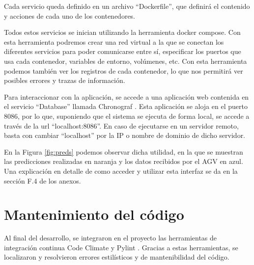 Cada servicio queda definido en un archivo ``Dockerfile'', que definirá el contenido y acciones de cada uno de los 
contenedores.

Todos estos servicios se inician utilizando la herramienta docker compose. Con esta herramienta podremos crear
una red virtual a la que se conectan los diferentes servicios para poder comunicarse entre sí, especificar los
puertos que usa cada contenedor, variables de entorno, volúmenes, etc. Con esta herramienta podemos también ver los registros de cada contenedor, lo que nos permitirá ver posibles errores 
y trazas de información.

Para interaccionar con la aplicación, se accede a una aplicación web contenida en el servicio ``Database'' llamada 
Chronograf \cite{chronograf:docs}. Esta aplicación se aloja en el puerto 8086, por lo que, suponiendo que el sistema 
se ejecuta de forma local, se accede a través de la url ``localhost:8086''. En caso de ejecutarse en un servidor remoto,
basta con cambiar ``localhost'' por la IP o nombre de dominio de dicho servidor.


En la Figura \ref{fig:preds} podemos observar dicha utilidad, en la que se muestran las predicciones realizadas en 
naranja y los datos recibidos por el AGV en azul. Una explicación en detalle de como acceder y utilizar esta interfaz se da 
en la sección F.4 de los anexos.

\section{Mantenimiento del código}

Al final del desarrollo, se integraron en el proyecto las herramientas de integración continua Code Climate \cite{codeclimate} y 
Pylint \cite{pylint}. Gracias a estas herramientas, se localizaron y resolvieron errores estilísticos y de mantenibilidad del código.